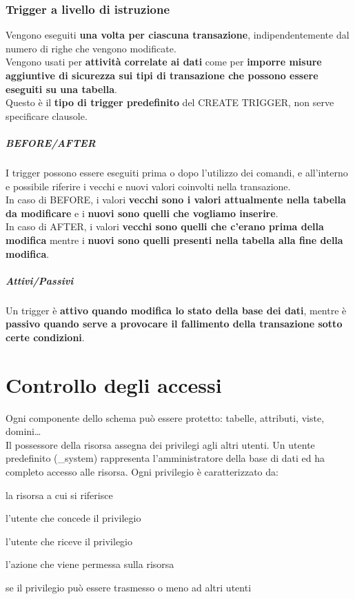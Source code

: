 \documentclass[10pt]{book}
\begin{document}
\subsection{Trigger a livello di istruzione}
Vengono eseguiti \textbf{una volta per ciascuna transazione}, indipendentemente dal numero di righe che vengono modificate.\\
Vengono usati per \textbf{attività correlate ai dati} come per \textbf{imporre misure aggiuntive di sicurezza sui tipi di transazione che possono essere eseguiti su una tabella}.\\
Questo è il \textbf{tipo di trigger predefinito} del CREATE TRIGGER, non serve specificare clausole.

\paragraph{BEFORE/AFTER} I trigger possono essere eseguiti prima o dopo l'utilizzo dei comandi, e all'interno e possibile riferire i vecchi e nuovi valori coinvolti nella transazione.\\
In caso di BEFORE, i valori \textbf{vecchi sono i valori attualmente nella tabella da modificare} e i \textbf{nuovi sono quelli che vogliamo inserire}.\\
In caso di AFTER, i valori \textbf{vecchi sono quelli che c'erano prima della modifica} mentre i \textbf{nuovi sono quelli presenti nella tabella alla fine della modifica}.
\paragraph{Attivi/Passivi} Un trigger è \textbf{attivo quando modifica lo stato della base dei dati}, mentre è \textbf{passivo quando serve a provocare il fallimento della transazione sotto certe condizioni}.
\chapter{Controllo degli accessi}
Ogni componente dello schema può essere protetto: tabelle, attributi, viste, domini\ldots\\
Il possessore della risorsa assegna dei privilegi agli altri utenti. Un utente predefinito (\_system) rappresenta l'amministratore della base di dati ed ha completo accesso alle risorsa. Ogni privilegio è caratterizzato da:
\begin{list}{}{}
	\item la risorsa a cui si riferisce
	\item l'utente che concede il privilegio
	\item l'utente che riceve il privilegio
	\item l'azione che viene permessa sulla risorsa
	\item se il privilegio può essere trasmesso o meno ad altri utenti
\end{list}
\end{document}
